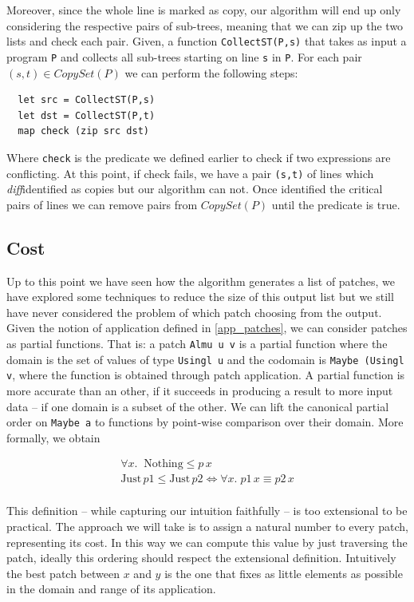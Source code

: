 \documentclass[11pt, titlepage]{article}
\newcommand{\toHaskell}[1]{\texttt{#1}\xspace}
\newcommand{\diff}{\emph{diff}}
\begin{document}
Moreover, since the whole line is marked as copy, our algorithm will end up only considering the respective pairs of sub-trees, meaning that we can zip up the two lists and check each pair. 
Given, a function \toHaskell{CollectST(P,s)} that takes as input a program \toHaskell{P} and collects all sub-trees starting on line \toHaskell{s} in \toHaskell{P}. 
For each pair $(s,t) \in CopySet(P)$ we can perform the following steps:
\begin{verbatim}
  let src = CollectST(P,s)
  let dst = CollectST(P,t)
  map check (zip src dst) 
\end{verbatim}

Where \texttt{check} is the predicate we defined earlier to check if two expressions are conflicting.
At this point, if check fails, we have a pair \texttt{(s,t)} of lines which \diff identified as copies but our algorithm can not. 
Once identified the critical pairs of lines we can remove pairs from $CopySet(P)$ until the predicate is true. 

\subsection{Cost}\label{cost}
Up to this point we have seen how the algorithm generates a list of patches, we have explored some techniques to reduce the size of this output list but we still have never considered the problem of which patch choosing from the output.
Given the notion of application defined in \ref{app_patches}, we can consider patches as partial functions. That is: a patch \toHaskell{Almu u v} is a partial function where the domain is the set of values of type \toHaskell{Usingl u} and the codomain is \toHaskell{Maybe (Usingl v}, where the function is obtained through patch application.
A partial function is more accurate than an other, if it succeeds in producing a result to more input data -- if one domain is a subset of the other.
We can lift the canonical partial order on \texttt{Maybe a} to functions by point-wise comparison over their domain. More formally, we obtain

\begin{center}
\begin{align*}
\forall x . \;\;  \mathrm{Nothing} \leq p \, x \\
\mathrm{Just} \, p1 \leq \mathrm{Just} \, p2 \iff  \forall x . \; p1 \, x \equiv  p2 \, x \\
\end{align*}
\end{center}
This definition -- while capturing our intuition faithfully -- is too extensional to be practical. The approach we will take is to assign a natural number to every patch, representing its cost. In this way we can compute this value by just traversing the patch, ideally this ordering should respect the extensional definition. Intuitively the best patch between $x$ and $y$ is the one that fixes as little elements as possible in the domain and range of its application.
\end{document}
